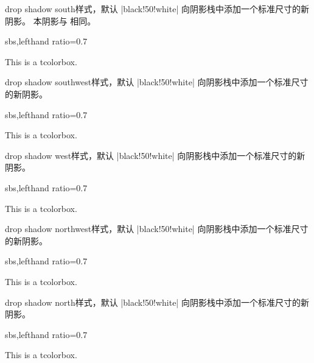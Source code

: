 \begin{docTcbKey}{drop shadow south}{}{样式，默认 |black!50!white|}
  向阴影栈中添加一个标准尺寸的新阴影。
  本阴影与  相同。
\begin{dispExample*}{sbs,lefthand ratio=0.7}
\begin{tcolorbox}[drop shadow south,
  enhanced,colback=red!5!white,colframe=red!75!black]
  This is a tcolorbox.
\end{tcolorbox}
\end{dispExample*}
\end{docTcbKey}%

\begin{docTcbKey}{drop shadow southwest}{}{样式，默认 |black!50!white|}
  向阴影栈中添加一个标准尺寸的新阴影。
\begin{dispExample*}{sbs,lefthand ratio=0.7}
\begin{tcolorbox}[drop shadow southwest,
  enhanced,colback=red!5!white,colframe=red!75!black]
  This is a tcolorbox.
\end{tcolorbox}
\end{dispExample*}
\end{docTcbKey}%

\begin{docTcbKey}{drop shadow west}{}{样式，默认 |black!50!white|}
  向阴影栈中添加一个标准尺寸的新阴影。
\begin{dispExample*}{sbs,lefthand ratio=0.7}
\begin{tcolorbox}[drop shadow west,
  enhanced,colback=red!5!white,colframe=red!75!black]
  This is a tcolorbox.
\end{tcolorbox}
\end{dispExample*}
\end{docTcbKey}%

\begin{docTcbKey}{drop shadow northwest}{}{样式，默认 |black!50!white|}
  向阴影栈中添加一个标准尺寸的新阴影。
\begin{dispExample*}{sbs,lefthand ratio=0.7}
\begin{tcolorbox}[drop shadow northwest,
  enhanced,colback=red!5!white,colframe=red!75!black]
  This is a tcolorbox.
\end{tcolorbox}
\end{dispExample*}
\end{docTcbKey}%

\begin{docTcbKey}{drop shadow north}{}{样式，默认 |black!50!white|}
  向阴影栈中添加一个标准尺寸的新阴影。
\begin{dispExample*}{sbs,lefthand ratio=0.7}
\begin{tcolorbox}[drop shadow north,
  enhanced,colback=red!5!white,colframe=red!75!black]
  This is a tcolorbox.
\end{tcolorbox}
\end{dispExample*}
\end{docTcbKey}%

